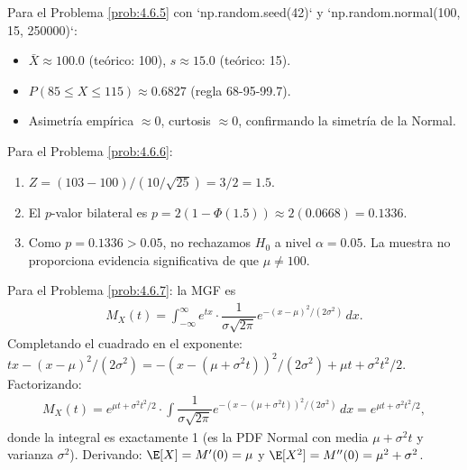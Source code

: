\begin{solucion}
	\label{sol:4.6.5}
	Para el Problema \ref{prob:4.6.5} con `np.random.seed(42)` y `np.random.normal(100, 15, 250000)`:
	\begin{itemize}
		\item $\bar{X} \approx 100.0$ (teórico: 100), $s \approx 15.0$ (teórico: 15).
		\item $P(85 \le X \le 115) \approx 0.6827$ (regla 68-95-99.7).
		\item Asimetría empírica $\approx 0$, curtosis $\approx 0$, confirmando la simetría de la Normal.
	\end{itemize}
\end{solucion}

\begin{solucion}
	\label{sol:4.6.6}
	Para el Problema \ref{prob:4.6.6}:
	\begin{enumerate}
		\item $Z = (103 - 100)/(10/\sqrt{25}) = 3/2 = 1.5$.
		\item El $p$-valor bilateral es $p = 2(1 - \Phi(1.5)) \approx 2(0.0668) = 0.1336$.
		\item Como $p = 0.1336 > 0.05$, no rechazamos $H_{0}$ a nivel $\alpha = 0.05$. La muestra no proporciona evidencia significativa de que $\mu \ne 100$.
	\end{enumerate}
\end{solucion}

\begin{solucion}
	\label{sol:4.6.7}
	Para el Problema \ref{prob:4.6.7}: la MGF es
	\begin{align*}
		M_{X}(t) = \int_{-\infty}^{\infty} e^{tx} \cdot \dfrac{1}{\sigma\sqrt{2\pi}} e^{-(x-\mu)^{2}/(2\sigma^{2})}\,dx.
	\end{align*}
	Completando el cuadrado en el exponente: $tx - (x-\mu)^{2}/(2\sigma^{2}) = -(x - (\mu + \sigma^{2}t))^{2}/(2\sigma^{2}) + \mu t + \sigma^{2}t^{2}/2$. Factorizando:
	\begin{align*}
		M_{X}(t) = e^{\mu t + \sigma^{2}t^{2}/2} \cdot \int \dfrac{1}{\sigma\sqrt{2\pi}} e^{-(x - (\mu + \sigma^{2}t))^{2}/(2\sigma^{2})}\,dx = e^{\mu t + \sigma^{2}t^{2}/2},
	\end{align*}
	donde la integral es exactamente 1 (es la PDF Normal con media $\mu + \sigma^{2}t$ y varianza $\sigma^{2}$). Derivando: $\E[X] = M'(0) = \mu$ y $\E[X^{2}] = M''(0) = \mu^{2} + \sigma^{2}$. \quad \qedhere
\end{solucion}

